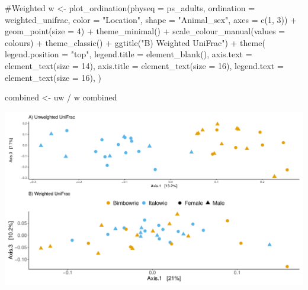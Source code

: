 \documentclass[
  letterpaper,
  DIV=11,
  numbers=noendperiod]{scrartcl}
\newenvironment{Shaded}{\begin{snugshade}}{\end{snugshade}}
\newcommand{\AttributeTok}[1]{\textcolor[rgb]{0.40,0.45,0.13}{#1}}
\newcommand{\CommentTok}[1]{\textcolor[rgb]{0.37,0.37,0.37}{#1}}
\newcommand{\DecValTok}[1]{\textcolor[rgb]{0.68,0.00,0.00}{#1}}
\newcommand{\FunctionTok}[1]{\textcolor[rgb]{0.28,0.35,0.67}{#1}}
\newcommand{\NormalTok}[1]{\textcolor[rgb]{0.00,0.23,0.31}{#1}}
\newcommand{\OtherTok}[1]{\textcolor[rgb]{0.00,0.23,0.31}{#1}}
\newcommand{\SpecialCharTok}[1]{\textcolor[rgb]{0.37,0.37,0.37}{#1}}
\newcommand{\StringTok}[1]{\textcolor[rgb]{0.13,0.47,0.30}{#1}}
\begin{document}
\begin{Shaded}
\begin{Highlighting}[]
\CommentTok{\#Weighted}
\NormalTok{w }\OtherTok{\textless{}{-}} \FunctionTok{plot\_ordination}\NormalTok{(}\AttributeTok{physeq =}\NormalTok{ ps\_adults,}
                \AttributeTok{ordination =}\NormalTok{ weighted\_unifrac,}
                \AttributeTok{color =} \StringTok{"Location"}\NormalTok{,}
                \AttributeTok{shape =} \StringTok{"Animal\_sex"}\NormalTok{,}
                \AttributeTok{axes =} \FunctionTok{c}\NormalTok{(}\DecValTok{1}\NormalTok{, }\DecValTok{3}\NormalTok{)) }\SpecialCharTok{+}
  \FunctionTok{geom\_point}\NormalTok{(}\AttributeTok{size =} \DecValTok{4}\NormalTok{) }\SpecialCharTok{+}
  \FunctionTok{theme\_minimal}\NormalTok{() }\SpecialCharTok{+}
  \FunctionTok{scale\_colour\_manual}\NormalTok{(}\AttributeTok{values =}\NormalTok{ colours) }\SpecialCharTok{+}
  \FunctionTok{theme\_classic}\NormalTok{() }\SpecialCharTok{+}
  \FunctionTok{ggtitle}\NormalTok{(}\StringTok{"B) Weighted UniFrac"}\NormalTok{) }\SpecialCharTok{+}
  \FunctionTok{theme}\NormalTok{(}
    \AttributeTok{legend.position =} \StringTok{"top"}\NormalTok{,}
    \AttributeTok{legend.title =} \FunctionTok{element\_blank}\NormalTok{(),}
    \AttributeTok{axis.text =} \FunctionTok{element\_text}\NormalTok{(}\AttributeTok{size =} \DecValTok{14}\NormalTok{),}
    \AttributeTok{axis.title =} \FunctionTok{element\_text}\NormalTok{(}\AttributeTok{size =} \DecValTok{16}\NormalTok{),}
    \AttributeTok{legend.text =} \FunctionTok{element\_text}\NormalTok{(}\AttributeTok{size =} \DecValTok{16}\NormalTok{),}
\NormalTok{    ) }

\NormalTok{combined }\OtherTok{\textless{}{-}}\NormalTok{ uw }\SpecialCharTok{/}\NormalTok{ w}
\NormalTok{combined}
\end{Highlighting}
\end{Shaded}

\includegraphics{code_files/figure-pdf/unnamed-chunk-6-1.pdf}
\end{document}
